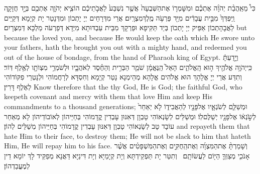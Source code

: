 {כִּי֩ מֵאַֽהֲבַ֨ת יְהֹוָ֜ה אֶתְכֶ֗ם וּמִשׇּׁמְר֤וֹ אֶת\maqqaf הַשְּׁבֻעָה֙ אֲשֶׁ֤ר נִשְׁבַּע֙ לַאֲבֹ֣תֵיכֶ֔ם הוֹצִ֧יא יְהֹוָ֛ה אֶתְכֶ֖ם בְּיָ֣ד חֲזָקָ֑ה וַֽיִּפְדְּךָ֙ מִבֵּ֣ית עֲבָדִ֔ים מִיַּ֖ד פַּרְעֹ֥ה מֶֽלֶךְ\maqqaf מִצְרָֽיִם׃}
{אֲרֵי מִדְּרָחֵים יְיָ יָתְכוֹן וּמִדְּנָטַר יָת קְיָמָא דְּקַיֵּים לַאֲבָהָתְכוֹן אַפֵּיק יְיָ יָתְכוֹן בְּיַד תַּקִּיפָא וּפַרְקָךְ מִבֵּית עַבְדּוּתָא מִיְּדָא דְּפַרְעֹה מַלְכָּא דְּמִצְרָיִם׃}
{but because the \lord\space loved you, and because He would keep the oath which He swore unto your fathers, hath the \lord\space brought you out with a mighty hand, and redeemed you out of the house of bondage, from the hand of Pharaoh king of Egypt.}{}
{וְיָ֣דַעְתָּ֔ כִּֽי\maqqaf יְהֹוָ֥ה אֱלֹהֶ֖יךָ ה֣וּא הָֽאֱלֹהִ֑ים הָאֵל֙ הַֽנֶּאֱמָ֔ן שֹׁמֵ֧ר הַבְּרִ֣ית וְהַחֶ֗סֶד לְאֹהֲבָ֛יו וּלְשֹׁמְרֵ֥י מִצְוֺתָ֖ו לְאֶ֥לֶף דּֽוֹר׃}
{וְתִדַּע אֲרֵי יְיָ אֱלָהָךְ הוּא אֱלֹהִים אֱלָהָא מְהֵימְנָא נָטַר קְיָמָא וְחִסְדָּא לְרָחֲמוֹהִי וּלְנָטְרֵי פִקּוֹדוֹהִי לְאֶלֶף דָּרִין׃}
{Know therefore that the \lord\space thy God, He is God; the faithful God, who keepeth covenant and mercy with them that love Him and keep His commandments to a thousand generations;}{}
{וּמְשַׁלֵּ֧ם לְשֹׂנְאָ֛יו אֶל\maqqaf פָּנָ֖יו לְהַאֲבִיד֑וֹ לֹ֤א יְאַחֵר֙ לְשֹׂ֣נְא֔וֹ אֶל\maqqaf פָּנָ֖יו יְשַׁלֶּם\maqqaf לֽוֹ׃}
{וּמְשַׁלֵּים לְשָׂנְאוֹהִי טָבְוָן דְּאִנּוּן עָבְדִין קֳדָמוֹהִי בְּחַיֵּיהוֹן לְאוֹבוֹדֵיהוֹן לָא מְאַחַר עוֹבָד טָב לְשָׂנְאוֹהִי טָבְוָן דְּאִנּוּן עָבְדִין קֳדָמוֹהִי בְּחַיֵּיהוֹן מְשַׁלֵּים לְהוֹן׃}
{and repayeth them that hate Him to their face, to destroy them; He will not be slack to him that hateth Him, He will repay him to his face.}{}
{וְשָׁמַרְתָּ֨ אֶת\maqqaf הַמִּצְוָ֜ה וְאֶת\maqqaf הַֽחֻקִּ֣ים וְאֶת\maqqaf הַמִּשְׁפָּטִ֗ים אֲשֶׁ֨ר אָנֹכִ֧י מְצַוְּךָ֛ הַיּ֖וֹם לַעֲשׂוֹתָֽם׃ \petucha }
{וְתִטַּר יָת תַּפְקֵידְתָּא וְיָת קְיָמַיָּא וְיָת דִּינַיָּא דַּאֲנָא מְפַקֵּיד לָךְ יוֹמָא דֵין לְמֶעֱבַדְהוֹן׃}
